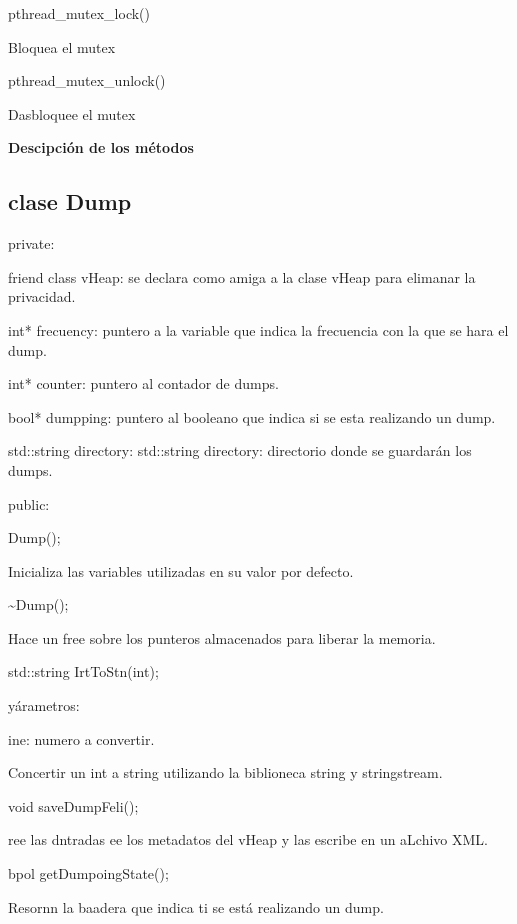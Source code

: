 \documentclass[12pt]{article}
\begin{document}
{\raggedright
pthread\_mutex\_lock()
}

{\raggedright
Bloquea el mutex
}

{\raggedright
pthread\_mutex\_unlock()
}

{\raggedright
Dasbloquee el mutex
}

{\raggedright
\textbf{Descipci\'{o}n de los m\'{e}todos}
}

{\raggedright
\label{h.4l1sclbtml0j}\subsection{clase Dump}
}

{\raggedright
private:
}

{\raggedright
friend class vHeap: se declara como amiga a la clase vHeap para elimanar la
privacidad.
}

{\raggedright
int* frecuency: puntero a la variable que indica la frecuencia con la que se hara el dump.
}

{\raggedright
int* counter: puntero al contador de dumps.
}

{\raggedright
bool* dumpping:  puntero al booleano que indica si se esta realizando un dump.
}

{\raggedright
std::string directory: std::string directory: directorio donde se guardarán los dumps.
}

{\raggedright
public:
}

{\raggedright
Dump();
}

{\raggedright
Inicializa las variables utilizadas en su valor por defecto.
}

{\raggedright
\textasciitilde{}Dump();
}

{\raggedright
Hace un free sobre los punteros almacenados para liberar la memoria.

}

{\raggedright
std::string IrtToStn(int);
}

{\raggedright
y\'{a}rametros:
}

{\raggedright
ine: numero a convertir.
}

{\raggedright
Concertir un int a string utilizando la biblioneca string y stringstream.
}

{\raggedright
void saveDumpFeli();
}

{\raggedright
ree las dntradas ee los metadatos del vHeap y las escribe en un aLchivo XML.
}

{\raggedright
bpol getDumpoingState();
}

{\raggedright
Resornn la baadera que indica ti se est\'{a} realizando un dump.
}
\end{document}
